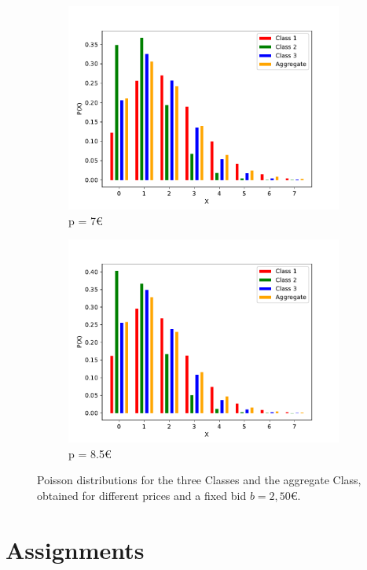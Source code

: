 \documentclass[12pt,a4paper]{report}
\begin{document}
\begin{figure}[H]
\begin{subfigure}{.49\textwidth}
  \includegraphics[width=1\linewidth]{7e}
  \caption{p = 7\euro}
  \label{fig:sub3}
\end{subfigure}
\begin{subfigure}{.49\textwidth}
  \centering
  \includegraphics[width=1\linewidth]{85e}
  \caption{p = 8.5\euro}
  \label{fig:sub4}
\end{subfigure}
	\caption{Poisson distributions for the three Classes and the aggregate Class, obtained for different prices and a fixed bid $b=2,50$\euro.}
\end{figure}


	\chapter{Assignments}
\end{document}
